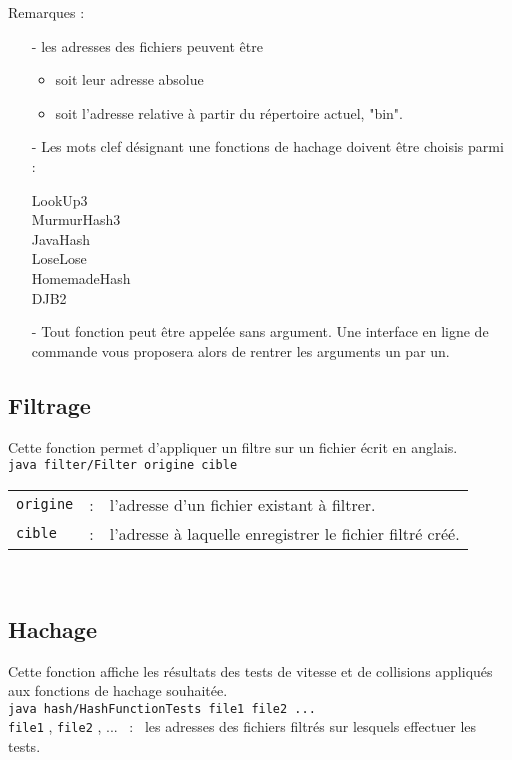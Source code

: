 \documentclass[12pt,a4paper,titlepage]{article}
\newcommand{\code}[1]{ \texttt{\footnotesize #1} }
\begin{document}
Remarques :
\begin{itemize}
\item[-] les adresses des fichiers peuvent être
	\begin{itemize}
	\item soit leur adresse absolue
	\item soit l'adresse relative à partir du répertoire actuel, "bin".
	\end{itemize}
\item[-] Les mots clef désignant une fonctions de hachage doivent être choisis parmi :
	\begin{center}
	LookUp3 \\
	MurmurHash3 \\
	JavaHash \\
	LoseLose \\
	HomemadeHash \\
	DJB2
	\end{center}
\item[-] Tout fonction peut être appelée sans argument. Une interface en ligne de commande vous proposera alors de rentrer les arguments un par un.
\end{itemize}



\subsection{Filtrage}
Cette fonction permet d'appliquer un filtre sur un fichier écrit en anglais.\\
\indent\indent\code{java filter/Filter origine cible}\\
\begin{tabular}{lcl}
\code{origine} &:& l'adresse d'un fichier existant à filtrer.\\
\code{cible} &:& l'adresse à laquelle enregistrer le fichier filtré créé.
\end{tabular}\\


\subsection{Hachage}
Cette fonction affiche les résultats des tests de vitesse et de collisions appliqués aux fonctions de hachage souhaitée.\\
\indent\indent\code{java hash/HashFunctionTests file1 file2 ...}\\
\code{file1}, \code{file2}, ... \ : \ les adresses des fichiers filtrés sur lesquels effectuer les tests.\\
\end{document}

